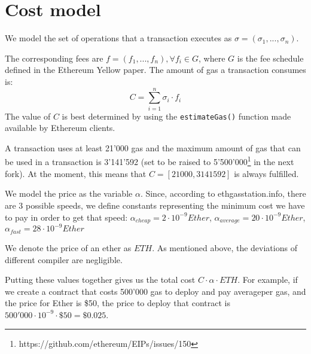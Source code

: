 \section{Cost model}

We model the set of operations that a transaction executes as $ \sigma = (\sigma_1, ..., \sigma_n) $.

The corresponding fees are $ f = (f_1, ..., f_n), \forall f_i \in G $, where $ G $ is the fee schedule defined in the Ethereum Yellow paper. The amount of gas a transaction consumes is: \[ C = \sum_{i = 1}^n \sigma_i \cdot f_i \] The value of $ C $ is best determined by using the \texttt{estimateGas()} function made available by Ethereum clients.

A transaction uses at least 21'000 gas and the maximum amount of gas that can be used in a transaction is 3'141'592 (set to be raised to 5'500'000\footnote{https://github.com/ethereum/EIPs/issues/150} in the next fork). At the moment, this means that $ C = [21000, 3141592] $ is always fulfilled.

We model the price as the variable $ \alpha $. Since, according to ethgasstation.info, there are 3 possible speeds, we define constants representing the minimum cost we have to pay in order to get that speed: $ \alpha_{cheap} = 2 \cdot 10^{-9} Ether $, $ \alpha_{average} = 20 \cdot 10^{-9} Ether $, $ \alpha_{fast} = 28 \cdot 10^{-9} Ether $

We denote the price of an ether as $ ETH $. As mentioned above, the deviations of different compiler are negligible.

Putting these values together gives us the total cost $ C \cdot \alpha \cdot ETH $. For example, if we create a contract that costs 500'000 gas to deploy and pay averageper gas, and the price for Ether is \$50, the price to deploy that contract is $ 500'000 \cdot 10^{-9} \cdot \$50 = \$0.025 $.